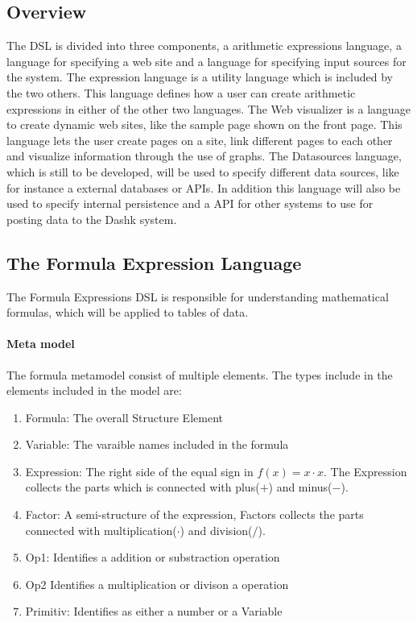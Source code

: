 \subsection{Overview}
The DSL is divided into three components, a arithmetic expressions language, a language for specifying a web site and a language for specifying input sources for the system. 
The expression language is a utility language which is included by the two others. 
This language defines how a user can create arithmetic expressions in either of the other two languages. 
The Web visualizer is a language to create dynamic web sites, like the sample page shown on the front page. 
This language lets the user create pages on a site, link different pages to each other and visualize information through the use of graphs. 
The Datasources language, which is still to be developed, will be used to specify different data sources, like for instance a external databases or APIs. 
In addition this language will also be used to specify internal persistence and a API for other systems to use for posting data to the Dashk system.

\subsection{The Formula Expression Language}
The Formula Expressions DSL is responsible for understanding mathematical formulas, which will be applied to tables of data.
\paragraph{Meta model}

The formula metamodel consist of multiple elements.
The types include in the elements included in the model are:
\begin{enumerate}
\item Formula: The overall Structure Element
\item Variable: The varaible names included in the formula
\item Expression: The right side of the equal sign in $f(x) = x \cdot x$. The Expression collects the parts which is connected with plus($+$) and minus($-$). 
\item Factor: A semi-structure of the expression, Factors collects the parts connected with multiplication($\cdot$) and division($/$).
\item Op1: Identifies a addition or substraction operation
\item Op2 Identifies a multiplication or divison a operation
\item Primitiv: Identifies as either a number or a Variable
\end{enumerate}

